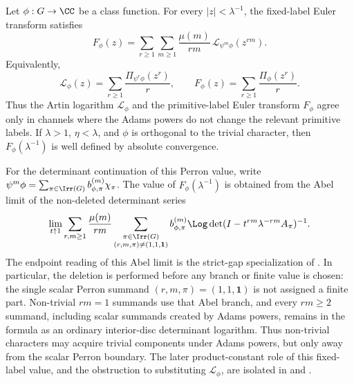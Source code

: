 \begin{theorem}
  \label{thm:fixed-label-euler-transform}
  Let \(\phi:G\to\CC\) be a class function. For every
  \(|z|<\lambda^{-1}\), the fixed-label Euler transform satisfies
  \begin{equation}\label{eq:fixed-label-euler-transform-adams-mobius}
    F_\phi(z)
    =
    \sum_{r\ge1}\sum_{m\ge1}
      \frac{\mu(m)}{rm}\,
      \mathcal L_{\psi^m\phi}(z^{rm}).
  \end{equation}
  Equivalently,
  \begin{equation}\label{eq:fixed-label-euler-transform-vs-artin}
    \mathcal L_\phi(z)
    =
    \sum_{r\ge1}\frac{\Pi_{\psi^r\phi}(z^r)}{r},
    \qquad
    F_\phi(z)
    =
    \sum_{r\ge1}\frac{\Pi_\phi(z^r)}{r}.
  \end{equation}
  Thus the Artin logarithm \(\mathcal L_\phi\) and the primitive-label
  Euler transform \(F_\phi\) agree only in channels where the Adams powers
  do not change the relevant primitive labels. If \(\lambda>1\),
  \(\eta<\lambda\), and \(\phi\) is orthogonal to the trivial character,
  then \(F_\phi(\lambda^{-1})\) is well defined by absolute convergence.

  For the determinant continuation of this Perron value, write
  \(\psi^m\phi=\sum_{\pi\in\Irr(G)}b_{\phi,\pi}^{(m)}\chi_\pi\).  The value of
  \(F_\phi(\lambda^{-1})\) is obtained from the Abel limit of the non-deleted
  determinant series
  \begin{equation}\label{eq:fixed-label-euler-transform-perron-branch-series}
    \lim_{t\uparrow1}
    \sum_{r,m\ge1}\frac{\mu(m)}{rm}
      \sum_{\substack{\pi\in\Irr(G)\\(r,m,\pi)\neq(1,1,\mathbf1)}}
        b_{\phi,\pi}^{(m)}
        \Log\det(I-t^{rm}\lambda^{-rm}A_\pi)^{-1}.
  \end{equation}
  The endpoint reading of this Abel limit is the strict-gap specialization of
  .  In particular, the
  deletion is performed before any branch or finite value is chosen: the single
  scalar Perron summand \((r,m,\pi)=(1,1,\mathbf1)\) is not assigned a finite
  part.  Non-trivial \(rm=1\) summands use that Abel branch, and every
  \(rm\ge2\) summand, including scalar summands created by Adams powers,
  remains in the formula as an ordinary interior-disc determinant logarithm.  Thus
  non-trivial characters may acquire trivial components under Adams powers, but
  only away from the scalar Perron boundary.  The later product-constant role
  of this fixed-label value, and the obstruction to substituting
  \(\mathcal L_\phi\), are isolated in
   and
  .
\end{theorem}


